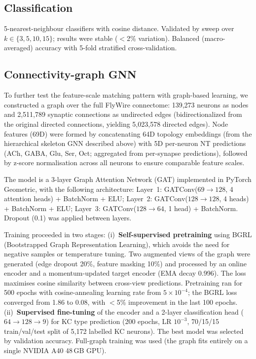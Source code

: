 \documentclass[10pt]{article}
\begin{document}
\subsection*{Classification}
5-nearest-neighbour classifiers with cosine distance. Validated by sweep over $k \in \{3, 5, 10, 15\}$; results were stable ($<$2\% variation). Balanced (macro-averaged) accuracy with 5-fold stratified cross-validation.

\subsection*{Connectivity-graph GNN}
To further test the feature-scale matching pattern with graph-based learning, we constructed a graph over the full FlyWire connectome: 139,273 neurons as nodes and 2,511,789 synaptic connections as undirected edges (bidirectionalized from the original directed connections, yielding 5,023,578 directed edges). Node features (69D) were formed by concatenating 64D topology embeddings (from the hierarchical skeleton GNN described above) with 5D per-neuron NT predictions (ACh, GABA, Glu, Ser, Oct; aggregated from per-synapse predictions), followed by z-score normalisation across all neurons to ensure comparable feature scales.

The model is a 3-layer Graph Attention Network (GAT)\cite{thakoor2022bgrl} implemented in PyTorch Geometric, with the following architecture: Layer~1: GATConv($69 \to 128$, 4 attention heads) + BatchNorm + ELU; Layer~2: GATConv($128 \to 128$, 4 heads) + BatchNorm + ELU; Layer~3: GATConv($128 \to 64$, 1 head) + BatchNorm. Dropout (0.1) was applied between layers.

Training proceeded in two stages: (i)~\textbf{Self-supervised pretraining} using BGRL (Bootstrapped Graph Representation Learning)\cite{thakoor2022bgrl}, which avoids the need for negative samples or temperature tuning. Two augmented views of the graph were generated (edge dropout 20\%, feature masking 10\%) and processed by an online encoder and a momentum-updated target encoder (EMA decay 0.996). The loss maximises cosine similarity between cross-view predictions. Pretraining ran for 500 epochs with cosine-annealing learning rate from $5 \times 10^{-4}$; the BGRL loss converged from 1.86 to 0.08, with $<$5\% improvement in the last 100 epochs. (ii)~\textbf{Supervised fine-tuning} of the encoder and a 2-layer classification head ($64 \to 128 \to 9$) for KC type prediction (200 epochs, LR $10^{-3}$, 70/15/15 train/val/test split of 5,172 labelled KC neurons). The best model was selected by validation accuracy. Full-graph training was used (the graph fits entirely on a single NVIDIA A40 48\,GB GPU).
\end{document}
